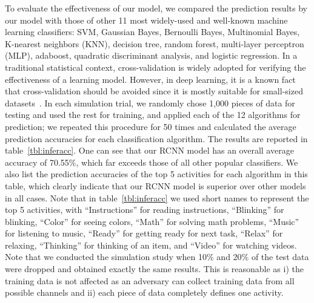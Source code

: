 \indent To evaluate the effectiveness of our model, we compared the prediction results by our model with those of other 11 most widely-used and well-known machine learning classifiers: SVM, Gaussian Bayes, Bernoulli Bayes, Multinomial Bayes, K-nearest neighbors (KNN), decision tree, random forest, multi-layer perceptron (MLP), adaboost, quadratic discriminant analysis, and logistic regression. In a traditional statistical context, cross-validation is widely adopted for verifying the effectiveness of a learning model. However, in deep learning, it is a known fact that cross-validation should be avoided  since it is mostly suitable for small-sized datasets~\cite{deepcrossvalid}. In each simulation trial, we randomly chose 1,000 pieces of data for testing and used the rest for training, and applied each of the 12 algorithms for prediction; we repeated this procedure for 50 times and calculated the average prediction accuracies for each classification algorithm. The results are reported in table~\ref{tbl:inferacc}. One can see that our RCNN model has an overall average accuracy of 70.55\%, which far exceeds those of all other popular classifiers. We also list the prediction accuracies of the top 5 activities for each algorithm in this table, which clearly indicate that our RCNN model is superior over other models in all cases. Note that in table~\ref{tbl:inferacc} we used short names to represent the top 5 activities, with ``Instructions'' for reading instructions, ``Blinking'' for blinking, ``Color'' for seeing colors, ``Math'' for solving math problems, ``Music'' for listening to music, ``Ready'' for getting ready for next task, ``Relax'' for relaxing, ``Thinking'' for thinking of an item, and ``Video'' for watching videos.   %
Note that we conducted the simulation study when 10\% and 20\% of the test data were dropped and obtained exactly the same results. This is reasonable as i) the training data is not affected as an adversary can collect training data from all possible channels and ii) each piece of data completely defines one activity.

